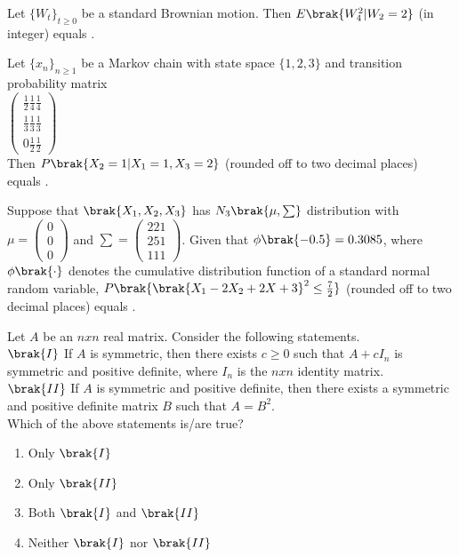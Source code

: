     \item Let $\{W_t\}_{t\geq 0}$ be a standard Brownian motion. Then $E\brak{W_4^2|W_2=2}$ (in integer) equals \underline{\hspace{2cm}}.
    \item Let $\{x_n\}_{n\geq 1}$ be a Markov chain with state space $\{1,2,3\}$ and transition probability matrix\\
    $\displaystyle \begin{pmatrix}
    \frac{1}{2} \frac{1}{4} \frac{1}{4}\\
    \frac{1}{3} \frac{1}{3} \frac{1}{3}\\
    0 \frac{1}{2} \frac{1}{2}
      \end{pmatrix}$\\ Then $P\brak{X_2=1|X_1=1,X_3=2}$ (rounded off to two decimal places) equals \underline{\hspace{2cm}}. 
    \item Suppose that $\brak{X_1,X_2,X_3}$ has $N_3\brak{\mu,\sum}$ distribution with $\mu = \begin{pmatrix}
        0\\0\\0
    \end{pmatrix}$ and $\sum=\begin{pmatrix}
        2 2 1\\2 5 1\\1 1 1
    \end{pmatrix}$. Given that $\phi\brak{-0.5}=0.3085$, where $\phi\brak{\cdot}$ denotes the cumulative distribution function of a standard normal random variable, $P\brak{\brak{X_1-2X_2+2X+3}^2\leq \frac{7}{2}}$ (rounded off to two decimal places) equals \underline{\hspace{2cm}}.  
    \item Let $A$ be an $nxn$ real matrix. Consider the following statements.\\
    $\brak{I}$ If $A$ is symmetric, then there exists $c\geq 0$ such that $A+cI_n$ is symmetric and positive definite, where $I_n$ is the $nxn$ identity matrix.\\
    $\brak{II}$ If $A$ is symmetric and positive definite, then there exists a symmetric and positive definite matrix $B$ such that $A=B^2$.\\Which of the above statements is/are true?
    \begin{enumerate}
        \item Only $\brak{I}$
        \item Only $\brak{II}$
        \item Both $\brak{I}$ and $\brak{II}$
        \item Neither $\brak{I}$ nor $\brak{II}$
    \end{enumerate} 
